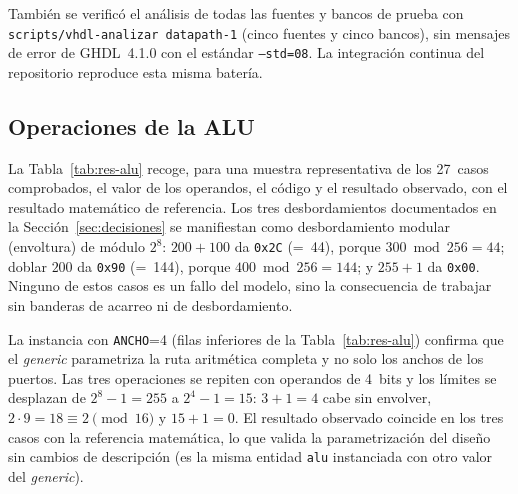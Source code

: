 \documentclass[llncs]{llncs}
\begin{document}
También se verificó el análisis de todas las fuentes y bancos de prueba
con \texttt{scripts/vhdl-analizar datapath-1} (cinco fuentes y cinco
bancos), sin mensajes de error de GHDL~4.1.0 con el estándar
\texttt{--std=08}. La integración continua del repositorio reproduce esta
misma batería.

\subsection{Operaciones de la ALU}

La Tabla~\ref{tab:res-alu} recoge, para una muestra representativa de los
27~casos comprobados, el valor de los operandos, el código y el resultado
observado, con el resultado matemático de referencia. Los tres
desbordamientos documentados en la Sección~\ref{sec:decisiones} se
manifiestan como desbordamiento modular (envoltura) de módulo $2^8$: $200+100$ da \texttt{0x2C} (=~44),
porque $300 \bmod 256 = 44$; doblar $200$ da \texttt{0x90} (=~144),
porque $400 \bmod 256 = 144$; y $255+1$ da \texttt{0x00}. Ninguno de estos
casos es un fallo del modelo, sino la consecuencia de trabajar sin banderas
de acarreo ni de desbordamiento.

La instancia con \texttt{ANCHO}=4 (filas inferiores de la
Tabla~\ref{tab:res-alu}) confirma que el \emph{generic} parametriza la
ruta aritmética completa y no solo los anchos de los puertos. Las tres
operaciones se repiten con operandos de 4~bits y los límites se desplazan
de $2^8-1=255$ a $2^4-1=15$: $3+1=4$ cabe sin envolver, $2\cdot9=18 \equiv 2 \pmod{16}$ y $15+1=0$. El
resultado observado coincide en los tres casos con la referencia
matemática, lo que valida la parametrización del diseño sin cambios de
descripción (es la misma entidad \texttt{alu} instanciada con otro valor
del \emph{generic}).
\end{document}
